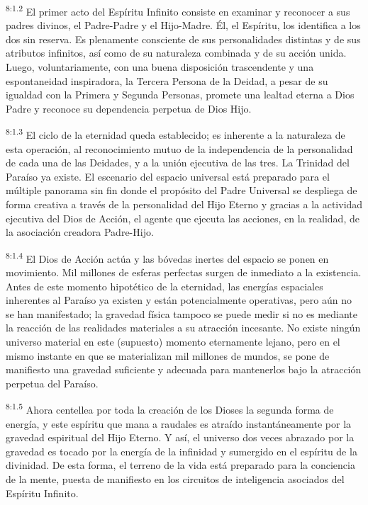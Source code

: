 \par
\textsuperscript{8:1.2} El primer acto del Espíritu Infinito consiste en examinar y reconocer a sus padres divinos, el Padre-Padre y el Hijo-Madre. Él, el Espíritu, los identifica a los dos sin reserva. Es plenamente consciente de sus personalidades distintas y de sus atributos infinitos, así como de su naturaleza combinada y de su acción unida. Luego, voluntariamente, con una buena disposición trascendente y una espontaneidad inspiradora, la Tercera Persona de la Deidad, a pesar de su igualdad con la Primera y Segunda Personas, promete una lealtad eterna a Dios Padre y reconoce su dependencia perpetua de Dios Hijo.

\par
\textsuperscript{8:1.3} El ciclo de la eternidad queda establecido; es inherente a la naturaleza de esta operación, al reconocimiento mutuo de la independencia de la personalidad de cada una de las Deidades, y a la unión ejecutiva de las tres. La Trinidad del Paraíso ya existe. El escenario del espacio universal está preparado para el múltiple panorama sin fin donde el propósito del Padre Universal se despliega de forma creativa a través de la personalidad del Hijo Eterno y gracias a la actividad ejecutiva del Dios de Acción, el agente que ejecuta las acciones, en la realidad, de la asociación creadora Padre-Hijo.

\par
\textsuperscript{8:1.4} El Dios de Acción actúa y las bóvedas inertes del espacio se ponen en movimiento. Mil millones de esferas perfectas surgen de inmediato a la existencia. Antes de este momento hipotético de la eternidad, las energías espaciales inherentes al Paraíso ya existen y están potencialmente operativas, pero aún no se han manifestado; la gravedad física tampoco se puede medir si no es mediante la reacción de las realidades materiales a su atracción incesante. No existe ningún universo material en este (supuesto) momento eternamente lejano, pero en el mismo instante en que se materializan mil millones de mundos, se pone de manifiesto una gravedad suficiente y adecuada para mantenerlos bajo la atracción perpetua del Paraíso.

\par
\textsuperscript{8:1.5} Ahora centellea por toda la creación de los Dioses la segunda forma de energía, y este espíritu que mana a raudales es atraído instantáneamente por la gravedad espiritual del Hijo Eterno. Y así, el universo dos veces abrazado por la gravedad es tocado por la energía de la infinidad y sumergido en el espíritu de la divinidad. De esta forma, el terreno de la vida está preparado para la conciencia de la mente, puesta de manifiesto en los circuitos de inteligencia asociados del Espíritu Infinito.

